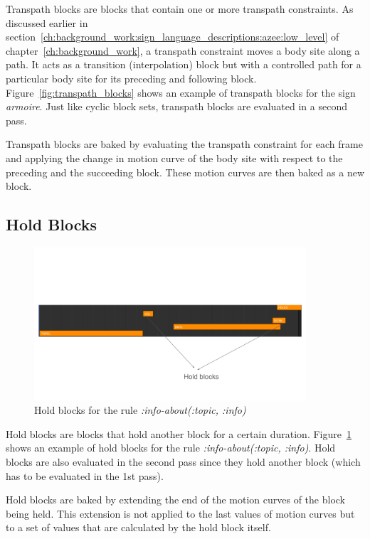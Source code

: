 \documentclass[../../main.tex]{subfiles}
\begin{document}
Transpath blocks are blocks that contain one or more transpath constraints. As discussed earlier in section~\ref{ch:background_work:sign_language_descriptions:azee:low_level} of chapter~\ref{ch:background_work}, a transpath constraint moves a body site along a path. It acts as a transition (interpolation) block but with a controlled path for a particular body site for its preceding and following block. Figure~\ref{fig:transpath_blocks} shows an example of transpath blocks for the sign \emph{armoire}. Just like cyclic block sets, transpath blocks are evaluated in a second pass.

Transpath blocks are baked by evaluating the transpath constraint for each frame and applying the change in motion curve of the body site with respect to the preceding and the succeeding block. These motion curves are then baked as a new block.

\subsection{Hold Blocks}
\label{ch:multi_track:second_pass:hold_blocks}

\begin{figure}[H]
    \centering
    \includegraphics[width=0.9\textwidth]{chapters/multi_track/images/hold_blocks.png}
    \caption{Hold blocks for the rule \emph{:info-about(:topic, :info)}}
    \label{fig:hold_blocks}
\end{figure}

Hold blocks are blocks that hold another block for a certain duration. Figure~\ref{fig:hold_blocks} shows an example of hold blocks for the rule \emph{:info-about(:topic, :info)}. Hold blocks are also evaluated in the second pass since they hold another block (which has to be evaluated in the 1st pass).

Hold blocks are baked by extending the end of the motion curves of the block being held. This extension is not applied to the last values of motion curves but to a set of values that are calculated by the hold block itself.
\end{document}
